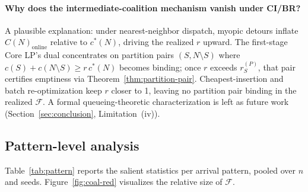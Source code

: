 \documentclass[11pt]{article}
\theoremstyle{plain}
\theoremstyle{definition}
\theoremstyle{remark}
\newcommand{\F}{\mathcal{F}}
\newcommand{\cstar}{c^{\ast}}
\begin{document}
\paragraph{Why does the intermediate-coalition mechanism vanish under CI/BR?} A plausible explanation: under nearest-neighbor dispatch, myopic detours inflate $C(N)_{\text{online}}$ relative to $\cstar(N)$, driving the realized $r$ upward. The first-stage Core LP's dual concentrates on partition pairs $(S,N\setminus S)$ where $c(S)+c(N\setminus S)\ge r\,\cstar(N)$ becomes binding; once $r$ exceeds $r^{(P)}_S$, that pair certifies emptiness via Theorem~\ref{thm:partition-pair}. Cheapest-insertion and batch re-optimization keep $r$ closer to 1, leaving no partition pair binding in the realized $\F$. A formal queueing-theoretic characterization is left as future work (Section~\ref{sec:conclusion}, Limitation~(iv)).

\subsection{Pattern-level analysis}
\label{ssec:pattern}

Table~\ref{tab:pattern} reports the salient statistics per arrival pattern, pooled over $n$ and seeds. Figure~\ref{fig:coal-red} visualizes the relative size of $\F$.
\end{document}
